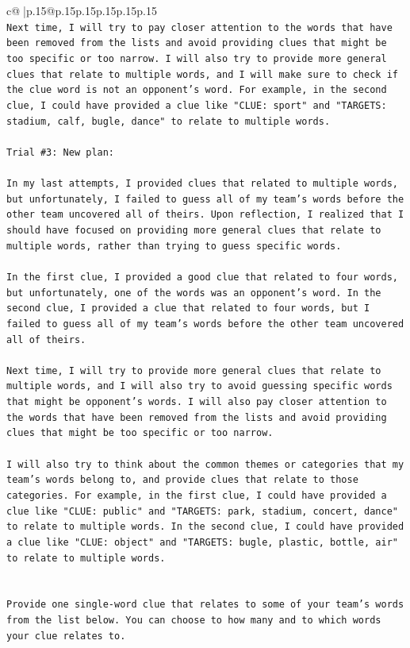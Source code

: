\documentclass{article}
\begin{document}
{\begin{supertabular}{c@{$\;$}|p{.15\linewidth}@{}p{.15\linewidth}p{.15\linewidth}p{.15\linewidth}p{.15\linewidth}p{.15\linewidth}}
{{{\\ 
\texttt{Next time, I will try to pay closer attention to the words that have been removed from the lists and avoid providing clues that might be too specific or too narrow. I will also try to provide more general clues that relate to multiple words, and I will make sure to check if the clue word is not an opponent's word. For example, in the second clue, I could have provided a clue like "CLUE: sport" and "TARGETS: stadium, calf, bugle, dance" to relate to multiple words.} \\
\\ 
\texttt{Trial \#3: New plan: } \\
\\ 
\texttt{In my last attempts, I provided clues that related to multiple words, but unfortunately, I failed to guess all of my team's words before the other team uncovered all of theirs. Upon reflection, I realized that I should have focused on providing more general clues that relate to multiple words, rather than trying to guess specific words. } \\
\\ 
\texttt{In the first clue, I provided a good clue that related to four words, but unfortunately, one of the words was an opponent's word. In the second clue, I provided a clue that related to four words, but I failed to guess all of my team's words before the other team uncovered all of theirs.} \\
\\ 
\texttt{Next time, I will try to provide more general clues that relate to multiple words, and I will also try to avoid guessing specific words that might be opponent's words. I will also pay closer attention to the words that have been removed from the lists and avoid providing clues that might be too specific or too narrow. } \\
\\ 
\texttt{I will also try to think about the common themes or categories that my team's words belong to, and provide clues that relate to those categories. For example, in the first clue, I could have provided a clue like "CLUE: public" and "TARGETS: park, stadium, concert, dance" to relate to multiple words. In the second clue, I could have provided a clue like "CLUE: object" and "TARGETS: bugle, plastic, bottle, air" to relate to multiple words.} \\
\\ 
\\ 
\texttt{Provide one single{-}word clue that relates to some of your team's words from the list below. You can choose to how many and to which words your clue relates to.} \\
}}}
\end{supertabular}}
\end{document}
